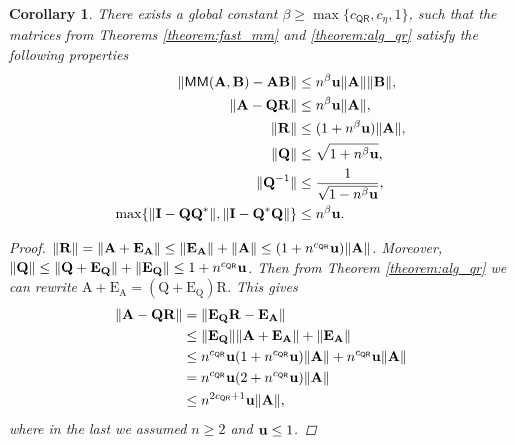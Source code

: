 \documentclass{article}
\newcommand{\lnorm}{\left\|}
\newcommand{\rnorm}{\right\|}
\newtheorem{corollary}{Corollary}[section]
\newcommand\matA{\boldsymbol{\mathrm{A}}}
\newcommand\matB{\boldsymbol{\mathrm{B}}}
\newcommand\matE{\boldsymbol{\mathrm{E}}}
\newcommand\matI{\boldsymbol{\mathrm{I}}}
\newcommand\matQ{\boldsymbol{\mathrm{Q}}}
\newcommand\matR{\boldsymbol{\mathrm{R}}}
\newcommand{\umach}{\textbf{\textup{u}}}
\newcommand{\QR}{\mathsf{QR}}
\newcommand{\MM}{\mathsf{MM}}
\newcommand{\cmm}{\beta}
\begin{document}
\begin{corollary}
\label{corollary:alg_qr}
There exists a global constant $\cmm\geq \max\{c_{\QR},c_{\eta},1\}$, such that the matrices from Theorems \ref{theorem:fast_mm} and \ref{theorem:alg_qr} satisfy the following properties
    \begin{align*}
        \lnorm  \MM(\matA,\matB)-\matA\matB \rnorm &\leq n^{\cmm} \umach \|\matA\|\|\matB\|,
        \\
        \lnorm \matA - \matQ\matR \rnorm &\leq  n^{\cmm}\umach\|\matA\|, 
        \\
        \|\matR\|&\leq (1+n^{\cmm}\umach)\|\matA\|,
        \\
        \|\matQ\|&\leq \sqrt{1+n^{\cmm}\umach},
        \\
        \|\matQ^{-1}\|&\leq \frac{1}{\sqrt{1-n^{\cmm}\umach}},
        \\
        \max\{
            \|\matI-\matQ\matQ^*\|,\|\matI-\matQ^*\matQ\|
        \}
        &\leq
        n^{\cmm}\umach.
    \end{align*}
\begin{proof}
    $\|\matR\|=\|\matA+\matE_{\matA}\|\leq \|\matE_{\matA}\|+\|\matA\|\leq (1+n^{c_{\QR}}\umach)\|\matA\|$.     Moreover, $\|\matQ\|\leq \|\matQ+\matE_{\matQ}\|+\|\matE_{\matQ}\|\leq 1+n^{c_{\QR}}\umach$.
    Then from Theorem \ref{theorem:alg_qr} we can rewrite $\matA+\matE_{\matA}=(\matQ+\matE_{\matQ})\matR$. This gives
    \begingroup
    \allowdisplaybreaks
    \begin{align*}
        \lnorm \matA-\matQ\matR\rnorm 
        &= 
        \lnorm
        \matE_{\matQ}\matR-\matE_{\matA}
        \rnorm\\
        &\leq 
        \|\matE_{\matQ}\| \|\matA+\matE_{\matA}\| + \|\matE_{\matA}\|\\
        &\leq
        n^{c_{\QR}}\umach (1+n^{c_{\QR}}\umach)\|\matA\| + n^{c_{\QR}}\umach \|\matA\|\\
        &=
        n^{c_{\QR}}\umach (2+n^{c_{\QR}}\umach)\|\matA\|
        \\
        &\leq
        n^{2c_{\QR}+1}\umach\|\matA\|,
    \end{align*}
    \endgroup
    where in the last we assumed $n\geq 2$ and $\umach\leq 1$.
\end{proof}
\end{corollary}
\end{document}
